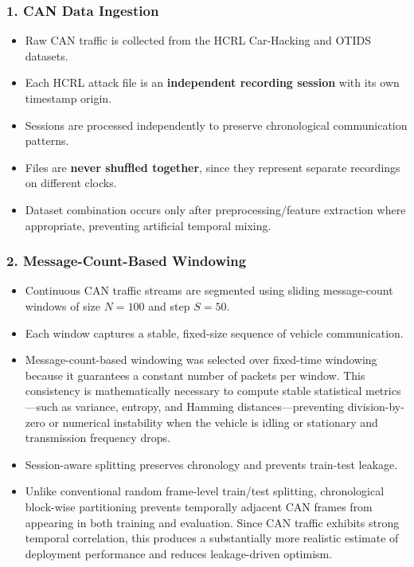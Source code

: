 \documentclass{article}
\begin{document}
\subsubsection{1. CAN Data Ingestion}
\begin{itemize}[noitemsep]
    \item Raw CAN traffic is collected from the HCRL Car-Hacking and OTIDS datasets.
    \item Each HCRL attack file is an \textbf{independent recording session} with its own timestamp origin.
    \item Sessions are processed independently to preserve chronological communication patterns.
    \item Files are \textbf{never shuffled together}, since they represent separate recordings on different clocks.
    \item Dataset combination occurs only after preprocessing/feature extraction where appropriate, preventing artificial temporal mixing.
\end{itemize}

\subsubsection{2. Message-Count-Based Windowing}
\begin{itemize}[noitemsep]
    \item Continuous CAN traffic streams are segmented using sliding message-count windows of size $N=100$ and step $S=50$.
    \item Each window captures a stable, fixed-size sequence of vehicle communication.
    \item Message-count-based windowing was selected over fixed-time windowing because it guarantees a constant number of packets per window. This consistency is mathematically necessary to compute stable statistical metrics—such as variance, entropy, and Hamming distances—preventing division-by-zero or numerical instability when the vehicle is idling or stationary and transmission frequency drops.
    \item Session-aware splitting preserves chronology and prevents train-test leakage.
    \item Unlike conventional random frame-level train/test splitting, chronological block-wise partitioning prevents temporally adjacent CAN frames from appearing in both training and evaluation. Since CAN traffic exhibits strong temporal correlation, this produces a substantially more realistic estimate of deployment performance and reduces leakage-driven optimism.
\end{itemize}
\end{document}
